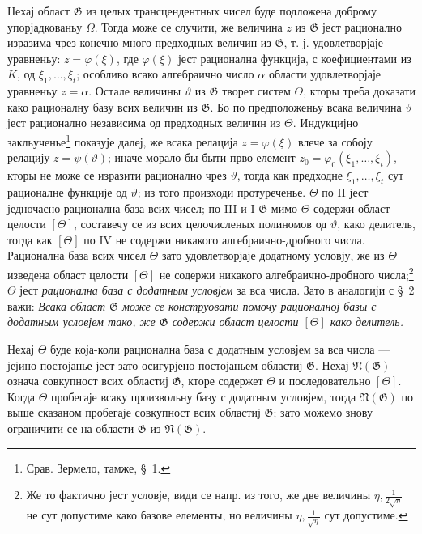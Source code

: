 ﻿\documentclass[11pt]{article}
\begin{document}
Нехај област $\mathfrak G$ из целых трансцендентных чисел буде подложена
доброму упорјадкованьу $\Omega$. Тогда може се случити, же величина $z$ из
$\mathfrak G$ јест рационално изразима чрез конечно много предходных величин из
$\mathfrak G$, т. ј. удовлетворјаје уравненьу:
$z=\varphi(\xi)$, где $\varphi(\xi)$ јест рационална функција, с коефициентами
из $K$, од $\xi_1,\ldots,\xi_t$; особливо всако алгебраично число $\alpha$
области удовлетворјаје уравненьу $z=\alpha$. Остале величины $\vartheta$ из
$\mathfrak G$ творет систем $\Theta$, кторы треба доказати како рационалну базу
всих величин из $\mathfrak G$. Бо по предположеньу всака величина $\vartheta$
јест рационално независима од предходных величин из $\Theta$. Индукцијно
закльученье\footnote{Срав. Зермело, тамже, \S\ 1.} показује далеј, же всака
релација $z=\varphi(\xi)$ влече за собоју релацију $z=\psi(\vartheta)$; иначе
морало бы быти прво елемент
$z_0=\varphi_0(\xi_1,\ldots,\xi_t)$, кторы не може се изразити рационално чрез
$\vartheta$, тогда как предходне $\xi_1,\ldots,\xi_t$ сут рационалне функције од
$\vartheta$; из того произходи протуреченье. $\Theta$ по II јест једночасно
рационална база всих чисел; по III и I $\mathfrak G$ мимо $\Theta$ содержи
област целости $[\Theta]$, составечу се из всих целочисленых полиномов од
$\vartheta$, како делитель, тогда как $[\Theta]$ по IV не содержи никакого
алгебраично-дробного числа. Рационална база всих чисел $\Theta$ зато
удовлетворјаје додатному условју, же из $\Theta$ изведена област целости
$[\Theta]$ не содержи никакого алгебраично-дробного числа;\footnote{Же то
фактично јест условје, види се напр. из того, же две величины
$\eta,\frac1{2\sqrt{\eta}}$ не сут допустиме како базове елементы, но величины
$\eta,\frac1{\sqrt{\eta}}$ сут допустиме.} $\Theta$ јест {\itshape рационална
база с додатным условјем} за вса числа. Зато в аналогији с \S\ 2 важи:
{\itshape Всака област $\mathfrak G$ може се конструовати помочу рационалној
базы с додатным условјем тако, же $\mathfrak G$ содержи област целости
$[\Theta]$ како делитель.}

Нехај $\Theta$ буде која-коли рационална база с додатным условјем за вса числа
--- јејино постојанье јест зато осигурјено постојаньем областиј
$\mathfrak G$. Нехај $\mathfrak N(\mathfrak G)$ означа совкупност всих областиј
$\mathfrak G$, кторе содержет $\Theta$ и последовательно $[\Theta]$. Когда
$\Theta$ пробегаје всаку произвольну базу с додатным условјем, тогда
$\mathfrak N(\mathfrak G)$ по выше сказаном пробегаје совкупност всих областиј
$\mathfrak G$; зато можемо знову ограничити се на области $\mathfrak G$ из
$\mathfrak N(\mathfrak G)$.
\end{document}

